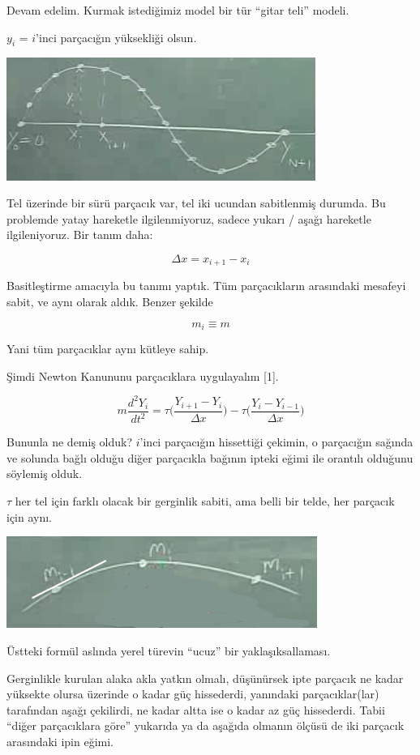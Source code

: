 \documentclass[12pt,fleqn]{article}\usepackage{../../common}
\begin{document}
Devam edelim. Kurmak istediğimiz model bir tür ``gitar teli'' modeli. 

$y_i$ = $i$'inci parçacığın yüksekliği olsun. 

\includegraphics[height=4cm]{1_07.png}

Tel üzerinde bir sürü parçacık var, tel iki ucundan sabitlenmiş durumda. Bu
problemde yatay hareketle ilgilenmiyoruz, sadece yukarı / aşağı hareketle
ilgileniyoruz. Bir tanım daha:

$$ \Delta x = x_{i+1} - x_i  $$

Basitleştirme amacıyla bu tanımı yaptık. Tüm parçacıkların arasındaki
mesafeyi sabit, ve aynı olarak aldık. Benzer şekilde

$$ m_i \equiv m $$

Yani tüm parçacıklar aynı kütleye sahip. 

Şimdi Newton Kanununu parçacıklara uygulayalım [1]. 

$$ m \frac{d^2Y_i}{dt^2} = 
\tau \bigg( \frac{Y_{i+1}- Y_i}{\Delta x} \bigg) -
\tau \bigg( \frac{Y_{i}- Y_{i-1}}{\Delta x} \bigg) 
$$

Bununla ne demiş olduk? $i$'inci parçacığın hissettiği çekimin, o
parçacığın sağında ve solunda bağlı olduğu diğer parçacıkla bağının ipteki
eğimi ile orantılı olduğunu söylemiş olduk.

$\tau$ her tel için farklı olacak bir gerginlik sabiti, ama belli bir
telde, her parçacık için aynı. 

\includegraphics[height=3cm]{1_08.png}

Üstteki formül aslında yerel türevin ``ucuz'' bir yaklaşıksallaması. 

Gerginlikle kurulan alaka akla yatkın olmalı, düşünürsek ipte parçacık ne
kadar yüksekte olursa üzerinde o kadar güç hissederdi, yanındaki
parçacıklar(lar) tarafından aşağı çekilirdi, ne kadar altta ise o kadar az
güç hissederdi. Tabii ``diğer parçacıklara göre'' yukarıda ya da aşağıda
olmanın ölçüsü de iki parçacık arasındaki ipin eğimi. 
\end{document}
